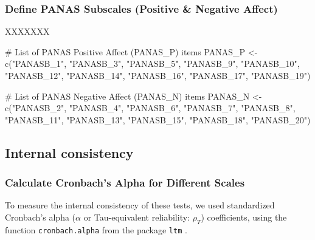 \documentclass[
  bookmarksnumbered]{article}
\newenvironment{Shaded}{\begin{snugshade}}{\end{snugshade}}
\newcommand{\CommentTok}[1]{\textcolor[rgb]{0.50,0.62,0.50}{#1}}
\newcommand{\FunctionTok}[1]{\textcolor[rgb]{0.94,0.94,0.56}{#1}}
\newcommand{\NormalTok}[1]{\textcolor[rgb]{0.80,0.80,0.80}{#1}}
\newcommand{\OtherTok}[1]{\textcolor[rgb]{0.94,0.94,0.56}{#1}}
\newcommand{\StringTok}[1]{\textcolor[rgb]{0.80,0.58,0.58}{#1}}
\begin{document}
\subsubsection{Define PANAS Subscales (Positive \& Negative Affect)}\label{define-panas-subscales-positive-negative-affect}

XXXXXXX

\begin{Shaded}
\begin{Highlighting}[]
\CommentTok{\# List of PANAS Positive Affect (PANAS\_P) items}
\NormalTok{PANAS\_P }\OtherTok{\textless{}{-}} \FunctionTok{c}\NormalTok{(}\StringTok{"PANASB\_1"}\NormalTok{, }\StringTok{"PANASB\_3"}\NormalTok{, }\StringTok{"PANASB\_5"}\NormalTok{, }\StringTok{"PANASB\_9"}\NormalTok{, }
             \StringTok{"PANASB\_10"}\NormalTok{, }\StringTok{"PANASB\_12"}\NormalTok{, }\StringTok{"PANASB\_14"}\NormalTok{, }\StringTok{"PANASB\_16"}\NormalTok{, }
             \StringTok{"PANASB\_17"}\NormalTok{, }\StringTok{"PANASB\_19"}\NormalTok{)}

\CommentTok{\# List of PANAS Negative Affect (PANAS\_N) items}
\NormalTok{PANAS\_N }\OtherTok{\textless{}{-}} \FunctionTok{c}\NormalTok{(}\StringTok{"PANASB\_2"}\NormalTok{, }\StringTok{"PANASB\_4"}\NormalTok{, }\StringTok{"PANASB\_6"}\NormalTok{, }\StringTok{"PANASB\_7"}\NormalTok{,}
             \StringTok{"PANASB\_8"}\NormalTok{, }\StringTok{"PANASB\_11"}\NormalTok{, }\StringTok{"PANASB\_13"}\NormalTok{, }\StringTok{"PANASB\_15"}\NormalTok{,}
             \StringTok{"PANASB\_18"}\NormalTok{, }\StringTok{"PANASB\_20"}\NormalTok{)}
\end{Highlighting}
\end{Shaded}

\subsection{Internal consistency}\label{internal-consistency}

\subsubsection{Calculate Cronbach's Alpha for Different Scales}\label{calculate-cronbachs-alpha-for-different-scales}

To measure the internal consistency of these tests, we used standardized Cronbach's alpha (\(\alpha\) or Tau-equivalent reliability: \(\rho_{T}\)) coefficients, using the function \texttt{cronbach.alpha} from the package \texttt{ltm} \autocite{LtmPackageLatent2006}.
\end{document}
